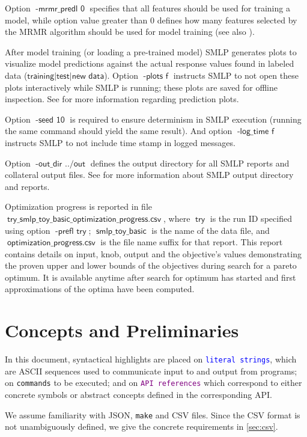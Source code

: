 \documentclass[a4paper,parskip=half]{article} %
\newcommand*\cmdstyle\texttt
\newcommand*\literalColor{blue}
\newcommand*\cmd[1]{\cmdstyle{\textcolor{red!85!black}{#1}}}
\newcommand*\literal[1]{\textcolor{\literalColor}{\cmdstyle{#1}}}
\newcommand*\api[1]{\textcolor{purple}{\cmdstyle{#1}}}
\newcommand*\option[1]{\operatorname{\mathsf{#1}}} %
\newcommand*\optionval[2]{\operatorname{\mathsf{#1}\,\,\mathsf{#2}}} %
\newcommand*\suffix[1]{\operatorname{\mathsf{#1}}} %
\begin{document}
Option $\optionval{-mrmr\_predl}{0}$ specifies that all features should be used for training a model, while option
value greater than $0$ defines how many features selected by the MRMR algorithm should be used for model training 
(see also ).

After model training (or loading a pre-trained model) SMLP generates plots to visualize model predictions 
against the actual response values found in labeled data ($\option{training|test|new\,\,data}$). 
 Option $\optionval{-plots}{f}$ instructs SMLP to not open these plots interactively while SMLP is running;
these plots are saved for offline inspection. See  for more information regarding prediction plots.

Option $\optionval{-seed}{10}$ is required to ensure determinism in SMLP execution (running the same command 
should yield the same result). And option $\optionval{-log\_time}{f}$ instructs SMLP to not include time stamp in
logged messages.

Option $\optionval{-out\_dir}{../out}$ defines the output directory for all SMLP reports and collateral output files.
See  for more information about SMLP output directory and reports. 

Optimization progress is reported in file $\suffix{try\_smlp\_toy\_basic\_optimization\_progress.csv}$, 
where $\option{try}$ is the run ID specified using option $\optionval{-prefl}{try}$; $\suffix{smlp\_toy\_basic}$ 
is the name of the data file, and $\suffix{optimization\_progress.csv}$ is the file name suffix for that report. 
This report contains details on input, knob, output and the objective's values demonstrating the proven 
upper and lower bounds of the objectives during search for a pareto optimum. It is available anytime
after search for optimum has started and first approximations of the optima have been computed.


\section{Concepts and Preliminaries}

In this document, syntactical highlights are placed on
\literal{literal strings}, which are ASCII sequences used to communicate input
to and output from programs; on \cmd{commands} to be executed;
and on \api{API references} which correspond to
either concrete symbols or abstract concepts defined in the corresponding API.

We assume familiarity with JSON, \cmd{make} and CSV files. Since the CSV format
is not unambiguously defined, we give the concrete requirements in
\cref{sec:csv}.
\end{document}
